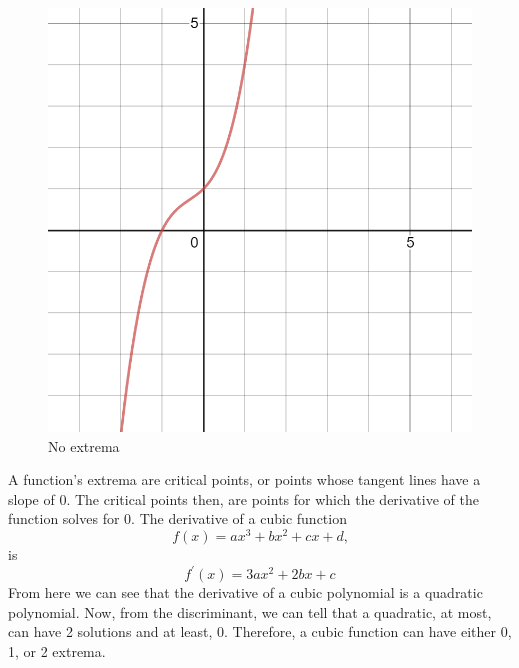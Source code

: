 \documentclass{article}
\begin{document}
\begin{enumerate}[label=\textbf{(13.\arabic*)}]
\begin{enumerate}[label=(\alph*)]
\begin{figure}[H]
\begin{minipage}{.3\textwidth}
  \centering
  \includegraphics[width=.4\linewidth]{graph7}
  \caption{No extrema}
  \label{fig:test3}
\end{minipage}
\end{figure}
\end{enumerate}
A function's extrema are critical points, or points whose tangent lines have a slope of 0. The critical points then, are points for which the derivative of the function solves for 0. The derivative of a cubic function
\[f(x)=ax^3+bx^2+cx+d\text{,}\]
is
\[f^\prime(x)=3ax^2+2bx+c\]
From here we can see that the derivative of a cubic polynomial is a quadratic polynomial. Now, from the discriminant, we can tell that a quadratic, at most, can have 2 solutions and at least, 0. Therefore, a cubic function can have either 0, 1, or 2 extrema.

\end{enumerate}
\end{document}
